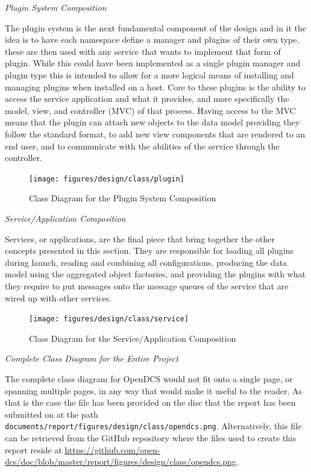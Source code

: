     \emph{Plugin System Composition}

    The plugin system is the next fundamental component of the design and in
    it the idea is to have each namespace define a manager and plugins of their
    own type, these are then used with any service that wants to implement that
    form of plugin. While this could have been implemented as a single plugin
    manager and plugin type this is intended to allow for a more logical means
    of installing and managing plugins when installed on a host. Core to these
    plugins is the ability to access the service application and what it
    provides, and more specifically the model, view, and controller (MVC) of
    that process. Having access to the MVC means that the plugin can attach new
    objects to the data model providing they follow the standard format, to add
    new view components that are rendered to an end user, and to communicate
    with the abilities of the service through the controller.

    \begin{figure}[H]
      \texttt{[image: figures/design/class/plugin]}
      \caption{Class Diagram for the Plugin System Composition}
      \label{fig:dsg-class-plugin}
    \end{figure}

    \emph{Service/Application Composition}

    Services, or applications, are the final piece that bring together the
    other concepts presented in this section. They are responsible for loading
    all plugins during launch, reading and combining all configurations,
    producing the data model using the aggregated object factories, and
    providing the plugins with what they require to put messages onto the
    message queues of the service that are wired up with other services.

    \begin{figure}[H]
        \texttt{[image: figures/design/class/service]}
      \caption{Class Diagram for the Service/Application Composition}
      \label{fig:dsg-class-service}
    \end{figure}

    \emph{Complete Class Diagram for the Entire Project}

    The complete class diagram for OpenDCS would not fit onto a single page, or
    spanning multiple pages, in any way that would make it useful to the
    reader.  As that is the case the file has been provided on the disc that
    the report has been submitted on at the path \\
    \texttt{documents/report/figures/design/class/opendcs.png}. Alternatively,
    this file can be retrieved from the GitHub repository where the files used
    to create this report reside at \url{https://github.com/open-dcs/doc/blob/master/report/figures/design/class/opendcs.png}.

